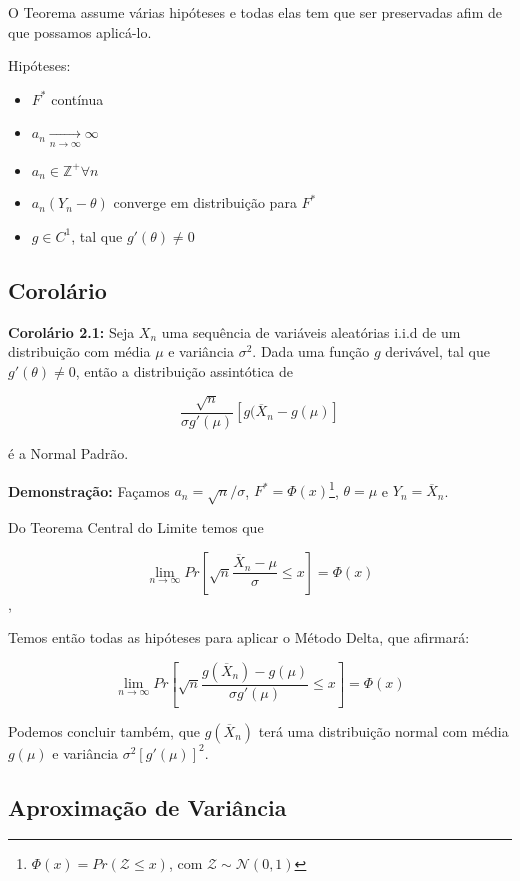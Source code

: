 \documentclass[12pt]{article}
\begin{document}
O Teorema assume várias hipóteses e todas elas tem que ser preservadas afim de que possamos aplicá-lo.

Hipóteses:

\begin{itemize}
    \item $F^*$ contínua
    \item $a_n\underset{n\to\infty}{\longrightarrow}\infty$
    \item $a_n\in\mathbb{Z}^+\forall n$
    \item $a_n(Y_n-\theta)$ converge em distribuição para $F^*$
    \item $g\in C^1$, tal que $g'(\theta)\neq0$
\end{itemize}

\subsection{Corolário}

\textbf{Corolário 2.1: }\cite{degroot2012probability} Seja $X_n$ uma sequência de variáveis aleatórias i.i.d de um distribuição com média $\mu$ e variância $\sigma^2$. Dada uma função $g$ derivável, tal que $g'(\theta)\neq 0$, então a distribuição assintótica de 

$$\dfrac{\sqrt{n}}{\sigma g'(\mu)}[g(\overline{X}_n-g(\mu)]$$

é a Normal Padrão.


\textbf{Demonstração: } Façamos $a_n=\sqrt{n}/\sigma$, $F^*=\Phi(x)$\footnote{$\Phi(x)=Pr(\mathcal{Z}\leq x)$, com $\mathcal{Z}\sim \mathcal{N}(0,1)$}, $\theta = \mu$ e $Y_n=\overline{X}_n$.

Do Teorema Central do Limite\cite{degroot2012probability} temos que 

$$\displaystyle\lim_{n\to\infty}Pr\left[\sqrt{n}\dfrac{\overline{X}_n-\mu}{\sigma}\leq x\right]=\Phi(x)$$,


Temos então todas as hipóteses para aplicar o Método Delta, que afirmará:

$$\displaystyle\lim_{n\to\infty}Pr\left[\sqrt{n}\dfrac{g(\overline{X}_n)-g(\mu)}{\sigma g'(\mu)}\leq x\right]=\Phi(x)$$

Podemos concluir também, que $g(\overline{X}_n)$ terá uma distribuição normal com média $g(\mu)$ e variância $\sigma^2[g'(\mu)]^2$.

\subsection{Aproximação de Variância}
\end{document}
